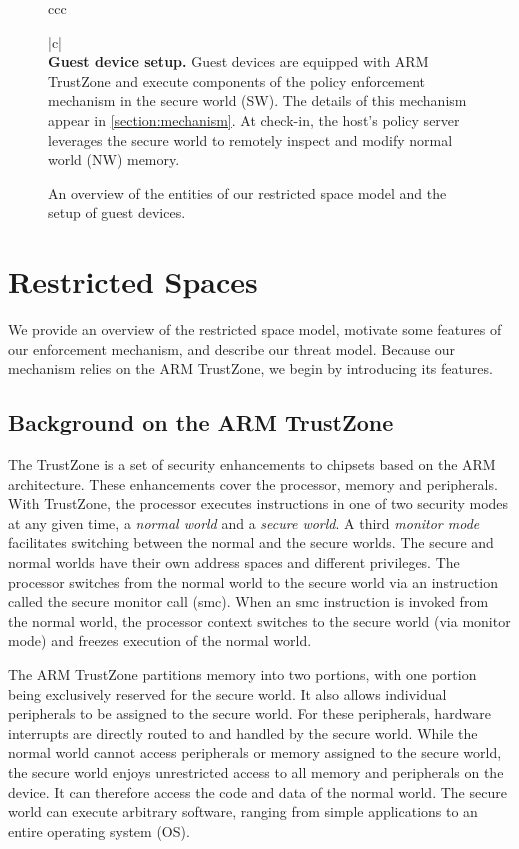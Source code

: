 \documentclass[pageno]{sig-alternate-05-2015}
\newcommand{\mysection}[1]{\section{#1}}
\newcommand{\sectref}[1]{\autoref{#1}}
\newcommand{\mycaption}[2]{\caption{#1}#2}
\begin{document}
\begin{figure}[t!]
\begin{tabular}{ccc}
\begin{minipage}{0.46\textwidth}
\begin{tabular}{|c|}
\indent\vspace{-0.5cm}\\
{\small {\bf Guest device setup.} Guest devices are equipped with ARM TrustZone
and execute components of the policy enforcement mechanism in the secure world
(SW). The details of this mechanism appear in \sectref{section:mechanism}.  At
check-in, the host's policy server leverages the secure world to remotely
inspect and modify normal world (NW) memory.}\\
\hline
\end{tabular}
\end{minipage}
\end{tabular}
\mycaption{An overview of the entities of our restricted space model and the
setup of guest devices.}
{\label{figure:restrictedspaces}}
\end{figure}

\mysection{Restricted Spaces}
\label{section:usagemodel}

We provide an overview of the restricted space model, motivate some features of
our enforcement mechanism, and describe our threat model. Because our mechanism
relies on the ARM TrustZone, we begin by introducing its features.

\subsection{Background on the ARM TrustZone}
\label{section:armback}

The TrustZone is a set of security enhancements to chipsets based on the ARM
architecture. These enhancements cover the processor, memory and peripherals.
With TrustZone, the processor executes instructions in one of two security
modes at any given time, a \textit{normal world} and a \textit{secure world}. A
third \textit{monitor mode} facilitates switching between the normal and the
secure worlds.  The secure and normal worlds have their own address spaces and
different privileges.  The processor switches from the normal world to the
secure world via an instruction called the secure monitor call (\textsf{smc}).
When an \textsf{smc} instruction is invoked from the normal world, the
processor context switches to the secure world (via monitor mode) and freezes
execution of the normal world.

The ARM TrustZone partitions memory into two portions, with one portion
being exclusively reserved for the secure world. It also allows individual
peripherals to be assigned to the secure world.  For these peripherals,
hardware interrupts are directly routed to and handled by the secure world.
While the normal world cannot access peripherals or memory assigned to the
secure world, the secure world enjoys unrestricted access to all memory and
peripherals on the device. It can therefore access the code and data of the
normal world. The secure world can execute arbitrary software, ranging from
simple applications to an entire operating system (OS).
%
\end{document}
